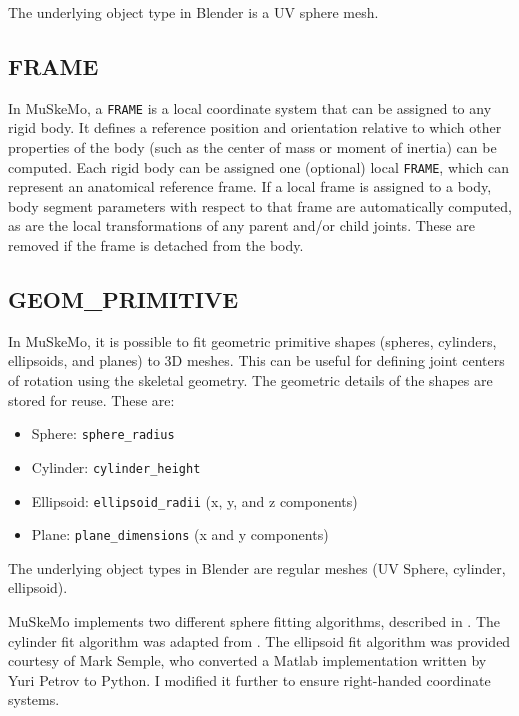 \documentclass{article}
\begin{document}
The underlying object type in Blender is a UV sphere mesh.


\subsection{FRAME}
\label{sec:frame}
In MuSkeMo, a \texttt{FRAME} is a local coordinate system that can be assigned to any rigid body. It defines a reference position and orientation relative to which other properties of the body (such as the center of mass or moment of inertia) can be computed. Each rigid body can be assigned one (optional) local \texttt{FRAME}, which can represent an anatomical reference frame. If a local frame is assigned to a body, body segment parameters with respect to that frame are automatically computed, as are the local transformations of any parent and/or child joints. These are removed if the frame is detached from the body.

\subsection{GEOM\_PRIMITIVE}

In MuSkeMo, it is possible to fit geometric primitive shapes (spheres, cylinders, ellipsoids, and planes) to 3D meshes. This can be useful for defining joint centers of rotation using the skeletal geometry. The geometric details of the shapes are stored for reuse. These are:

\begin{itemize}
    \item Sphere: \texttt{sphere\_radius}
    \item Cylinder: \texttt{cylinder\_height}
    \item Ellipsoid: \texttt{ellipsoid\_radii} (x, y, and z components)
    \item Plane: \texttt{plane\_dimensions} (x and y components)
\end{itemize}

The underlying object types in Blender are regular meshes (UV Sphere, cylinder, ellipsoid).

MuSkeMo implements two different sphere fitting algorithms, described in \cite{Jekel2016, yesudasanFastGeometricFit2015}. The cylinder fit algorithm was adapted from \cite{eberlyLeastSquaresFitting}. The ellipsoid fit algorithm \cite{semplePyEllipsoid_Fit} was provided courtesy of Mark Semple, who converted a Matlab implementation written by Yuri Petrov to Python. I modified it further to ensure right-handed coordinate systems.
\end{document}
